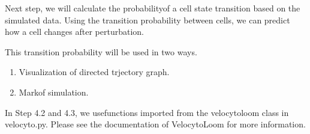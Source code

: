 \documentclass[letterpaper,10pt,english]{sphinxmanual}
\begin{document}
Next step, we will calculate the probabilityof a cell state transition based on the simulated data. Using the transition probability between cells, we can predict how a cell changes after perturbation.

This transition probability will be used in two ways.
\begin{enumerate}
\def\theenumi{\arabic{enumi}}
\def\labelenumi{(\theenumi )}
\makeatletter\def\p@enumii{\p@enumi (\theenumi )}\makeatother
\item {} 
Visualization of directed trjectory graph.

\item {} 
Markof simulation.

\end{enumerate}

In Step 4.2 and 4.3, we usefunctions imported from the velocytoloom class in velocyto.py. Please see the documentation of VelocytoLoom for more information. 

{
\begin{sphinxVerbatim}[commandchars=\\\{\}]
\llap{\color{nbsphinxin}[35]:\,\hspace{\fboxrule}\hspace{\fboxsep}}
  

  

   
\end{sphinxVerbatim}
}
\end{document}
